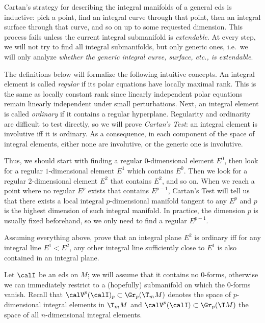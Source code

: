 Cartan's strategy for describing the integral manifolds of a general \gls{eds} is inductive: pick a point, find an integral curve through that point, then an integral surface through that curve, and so on up to some requested dimension. This process fails unless the current integral submanifold is \emph{extendable}. At every step, we will not try to find all integral submanifolds, but only generic ones, i.e.\ we will only analyze \emph{whether the generic integral curve, surface, etc., is extendable}.

The definitions below will formalize the following intuitive concepts. An integral element is called \emph{regular} if its polar equations have locally maximal rank. This is the same as locally constant rank since linearly independent polar equations remain linearly independent under small perturbations. Next, an integral element is called \emph{ordinary} if it contains a regular hyperplane. Regularity and ordinarity are difficult to test directly, so we will prove \emph{Cartan's Test}: an integral element is involutive iff it is ordinary. As a consequence, in each component of the space of integral elements, either none are involutive, or the generic one is involutive.

Thus, we should start with finding a regular $0$-dimensional element $E^0$, then look for a regular $1$-dimensional element $E^1$ which contains $E^0$. Then we look for a regular $2$-dimensional element $E^2$ that contains $E^2$, and so on. When we reach a point where no regular $E^p$ exists that contains $E^{p-1}$, Cartan's Test will tell us that there exists a local integral $p$-dimensional manifold tangent to any $E^p$ and $p$ is the highest dimension of such integral manifold. In practice, the dimension $p$ is usually fixed beforehand, so we only need to find a regular $E^{p-1}$.

\begin{xca}
    Assuming everything above, prove that an integral plane $E^2$ is ordinary iff for any integral line $E^1<E^2$, any other integral line sufficiently close to $E^1$ is also contained in an integral plane.
\end{xca}

Let $\calI$ be an \gls{eds} on $M$; we will assume that it contains no $0$-forms, otherwise we can immediately restrict to a (hopefully) submanifold on which the $0$-forms vanish. Recall that $\calV^p(\calI)_p\subset \Gr_p(\T_m M)$ denotes the space of $p$-dimensional integral elements in $\T_m M$ and $\calV^p(\calI)\subset \Gr_p(\T M)$ the space of all $n$-dimensional integral elements. 

